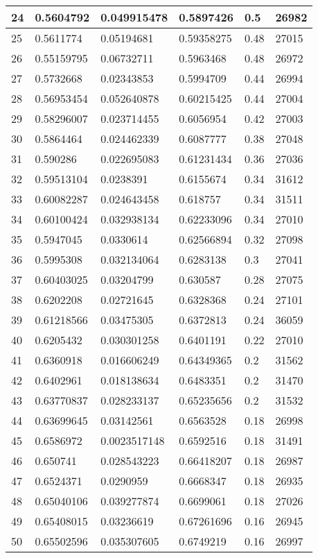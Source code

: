 \begin{longtable}{|l|l|l|l|l|l|}
24 & 0.5604792 & 0.049915478 & 0.5897426 & 0.5 & 26982 \\ \hline 
25 & 0.5611774 & 0.05194681 & 0.59358275 & 0.48 & 27015 \\ \hline 
26 & 0.55159795 & 0.06732711 & 0.5963468 & 0.48 & 26972 \\ \hline 
27 & 0.5732668 & 0.02343853 & 0.5994709 & 0.44 & 26994 \\ \hline 
28 & 0.56953454 & 0.052640878 & 0.60215425 & 0.44 & 27004 \\ \hline 
29 & 0.58296007 & 0.023714455 & 0.6056954 & 0.42 & 27003 \\ \hline 
30 & 0.5864464 & 0.024462339 & 0.6087777 & 0.38 & 27048 \\ \hline 
31 & 0.590286 & 0.022695083 & 0.61231434 & 0.36 & 27036 \\ \hline 
32 & 0.59513104 & 0.0238391 & 0.6155674 & 0.34 & 31612 \\ \hline 
33 & 0.60082287 & 0.024643458 & 0.618757 & 0.34 & 31511 \\ \hline 
34 & 0.60100424 & 0.032938134 & 0.62233096 & 0.34 & 27010 \\ \hline 
35 & 0.5947045 & 0.0330614 & 0.62566894 & 0.32 & 27098 \\ \hline 
36 & 0.5995308 & 0.032134064 & 0.6283138 & 0.3 & 27041 \\ \hline 
37 & 0.60403025 & 0.03204799 & 0.630587 & 0.28 & 27075 \\ \hline 
38 & 0.6202208 & 0.02721645 & 0.6328368 & 0.24 & 27101 \\ \hline 
39 & 0.61218566 & 0.03475305 & 0.6372813 & 0.24 & 36059 \\ \hline 
40 & 0.6205432 & 0.030301258 & 0.6401191 & 0.22 & 27010 \\ \hline 
41 & 0.6360918 & 0.016606249 & 0.64349365 & 0.2 & 31562 \\ \hline 
42 & 0.6402961 & 0.018138634 & 0.6483351 & 0.2 & 31470 \\ \hline 
43 & 0.63770837 & 0.028233137 & 0.65235656 & 0.2 & 31532 \\ \hline 
44 & 0.63699645 & 0.03142561 & 0.6563528 & 0.18 & 26998 \\ \hline 
45 & 0.6586972 & 0.0023517148 & 0.6592516 & 0.18 & 31491 \\ \hline 
46 & 0.650741 & 0.028543223 & 0.66418207 & 0.18 & 26987 \\ \hline 
47 & 0.6524371 & 0.0290959 & 0.6668347 & 0.18 & 26935 \\ \hline 
48 & 0.65040106 & 0.039277874 & 0.6699061 & 0.18 & 27026 \\ \hline 
49 & 0.65408015 & 0.03236619 & 0.67261696 & 0.16 & 26945 \\ \hline 
50 & 0.65502596 & 0.035307605 & 0.6749219 & 0.16 & 26997 \\ \hline 
\end{longtable}